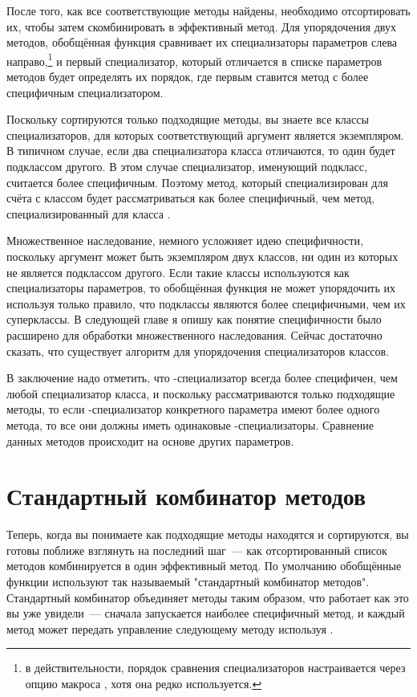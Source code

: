 После того, как все соответствующие методы найдены, необходимо отсортировать их, чтобы
затем скомбинировать в эффективный метод.  Для упорядочения двух методов, обобщённая
функция сравнивает их специализаторы параметров слева направо,\footnote{в
  действительности, порядок сравнения специализаторов настраивается через опцию
   макроса , хотя она редко
  используется.} и первый специализатор, который отличается в списке параметров методов
будет определять их порядок, где первым ставится метод с более специфичным
специализатором.

Поскольку сортируются только подходящие методы, вы знаете все классы специализаторов, для
которых соответствующий аргумент является экземпляром.  В типичном случае, если два
специализатора класса отличаются, то один будет подклассом другого.  В этом случае
специализатор, именующий подкласс, считается более специфичным.  Поэтому метод, который
специализирован для счёта с классом  будет рассматриваться как
более специфичный, чем метод, специализированный для класса .

Множественное наследование, немного усложняет идею специфичности, поскольку аргумент может
быть экземпляром двух классов, ни один из которых не является подклассом другого.  Если
такие классы используются как специализаторы параметров, то обобщённая функция не может
упорядочить их используя только правило, что подклассы являются более специфичными, чем их
суперклассы.  В следующей главе я опишу как понятие специфичности было расширено для
обработки множественного наследования.  Сейчас достаточно сказать, что существует алгоритм
для упорядочения специализаторов классов.

В заключение надо отметить, что -специализатор всегда более специфичен, чем
любой специализатор класса, и поскольку рассматриваются только подходящие методы, то если
-специализатор конкретного параметра имеют более одного метода, то все они
должны иметь одинаковые -специализаторы.  Сравнение данных методов происходит на
основе других параметров.

\section{Стандартный комбинатор методов}

Теперь, когда вы понимаете как подходящие методы находятся и сортируются, вы готовы
поближе взглянуть на последний шаг~--- как отсортированный список методов комбинируется в
один эффективный метод.  По умолчанию обобщённые функции используют так называемый
"стандартный комбинатор методов".  Стандартный комбинатор объединяет методы таким образом,
что  работает как это вы уже увидели~--- сначала запускается
наиболее специфичный метод, и каждый метод может передать управление следующему методу
используя .

